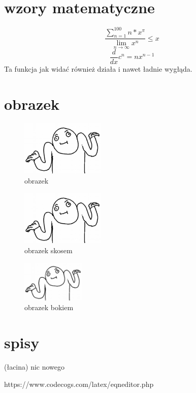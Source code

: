 \documentclass[11pt]{article}
\begin{document}
\section{wzory matematyczne}
\begin{equation}
\frac{\sum_{n=1}^{100}n*x^{\pi }}{\lim_{n \to \infty}x^{n}}\leq x
\end{equation}
\begin{equation}
\frac{d}{dx}c^n=nx^{n-1}
\end{equation}
\cite{równania}
Ta funkcja jak widać również działa i nawet ładnie wygłąda.
\newpage
\section{obrazek}
\begin{figure}[!h]
\begin{center}
\includegraphics[keepaspectratio,width=40mm]{pic}
\caption{obrazek}
\end{center}
\end{figure}

\begin{figure}[!h]
\begin{center}
\includegraphics[angle=315,keepaspectratio,width=40mm]{pic}
\caption{obrazek skosem}
\end{center}
\end{figure}

\begin{figure}[!h]
\begin{center}
\includegraphics[angle=270,keepaspectratio,width=30mm]{pic}
\caption{obrazek bokiem}
\end{center}
\end{figure}
\newpage
\section{spisy}
\tableofcontents
\listoffigures
\listoftables
\newpage
\begin{thebibliography}{8}
(łacina) nic nowego

 https://www.codecogs.com/latex/eqneditor.php
\end{thebibliography}
\end{document}
